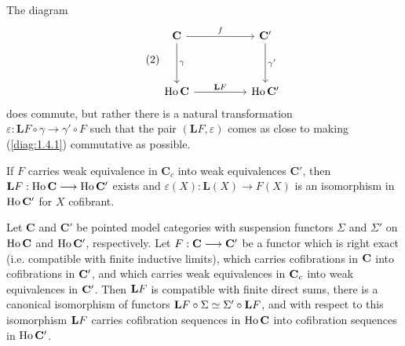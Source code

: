 \documentclass[../main]{subfiles}
\begin{document}
\begin{remark*}
The diagram
\[\tag{2}\label{diag:1.4.2}
\begin{tikzcd}
    \mathbf{C}\arrow[rr,"f"] \arrow[dd,"\gamma"]&& \mathbf{C}'\arrow[dd,"\gamma'"] \\ \\
    \Ho \mathbf{C} \arrow[rr, "\mathbf{L}F"]&& \Ho \mathbf{C}'
\end{tikzcd}
\]
does  commute, but rather there is a natural transformation \\$\varepsilon: \mathbf{L}F\circ \gamma \longrightarrow \gamma'\circ F$ such that the pair $(\mathbf{L}F,\varepsilon)$ comes as close to making (\ref{diag:1.4.1}) commutative as possible.
\end{remark*}
\begin{corollary*}
If $F$ carries weak equivalence in $\mathbf{C}_c$ into weak equivalences $\mathbf{C}'$, then $\mathbf{L}F:\operatorname{Ho}\mathbf{C}\longrightarrow\operatorname{Ho}\mathbf{C}'$ exists and $\varepsilon(X):\mathbf{L}(X)\longrightarrow F(X)$ is an isomorphism in $\operatorname{Ho} \mathbf{C}'$ for $X$ cofibrant.
\end{corollary*}
\begin{proposition}\label{prop:1.4.2}
Let $\mathbf{C}$ and $\mathbf{C}'$ be pointed model categories with suspension functors $\Sigma$ and $\Sigma'$ on $\operatorname{Ho}\mathbf{C}$ and $\operatorname{Ho}\mathbf{C}'$, respectively. Let $F:\mathbf{C}\longrightarrow \mathbf{C}'$ be a functor which is right exact (i.e. compatible with finite inductive limits), which carries cofibrations in $\mathbf{C}$ into  cofibrations in $\mathbf{C}'$, and which carries weak equivalences in $\mathbf{C}_c$ into weak equivalences in $\mathbf{C}'$. Then $\mathbf{L} F$ is compatible with finite direct sums, there is a canonical isomorphism of functors $\mathbf{L} F\circ \Sigma \simeq \Sigma'\circ\mathbf{L} F$, and with respect to this isomorphism $\mathbf{L} F$ carries cofibration sequences in $\operatorname{Ho}\mathbf{C}$ into cofibration sequences in $\operatorname{Ho}\mathbf{C}'$.
\end{proposition}
\end{document}
